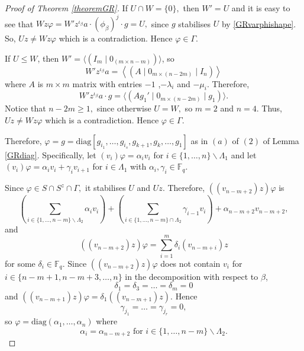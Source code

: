\documentclass[a4paper,reqno,11pt]{amsart}
\theoremstyle{definition}
\theoremstyle{remark}
\numberwithin{equation}{section}
\newcommand{\diag}{\mathrm{diag}}
\begin{document}
\begin{proof}[Proof of Theorem {\rm \ref{theoremGR}}]
 If $U \cap W=\{0\},$ then $W'=U$ and it is easy to see that $Wz \varphi = W'z^{\iota_{\beta}}a\cdot (\phi_{\beta})^j \cdot g= U,$ since $g$ stabilises $U$ by \eqref{GRvarphishape}. So, $Uz \ne Wz \varphi$ which is a contradiction. Hence $\varphi \in \Gamma.$

If $U \le W$, then $W'= \langle (I_m  \mid  0_{(m \times n-m)}) \rangle$, so 
$$W'z^{\iota_{\beta}}a= \left \langle 
(A \mid 0_{m \times (n-2m)} \mid I_n)
\right \rangle$$
where $A$ is $m \times m$ matrix with entries $-1$ ,$-\lambda_i$ and $- \mu_i$.
Therefore, $$W'z^{\iota_{\beta}}a \cdot g = \langle (A g_1'\mid 0_{m \times (n-2m)}\mid g_1) \rangle.$$ Notice that $n-2m\ge 1,$ since otherwise  $U = W,$ so $m=2$ and $n=4.$ Thus, $Uz \ne Wz \varphi$ which is a contradiction. Hence $\varphi \in \Gamma.$

Therefore, $\varphi = g= \diag[g_{i_1}, \ldots,g_{i_s}, g_{k+1}, g_k, \ldots,  g_1]$ as in $(a)$ of $(2)$ of Lemma
\ref{GRdiag}. Specifically, let $(v_i)\varphi =\alpha_i v_i$ for $i \in \{1, \ldots, n\} \backslash \Lambda_1$ and let $(v_i)\varphi = \alpha_i v_i + \gamma_i v_{i+1}$ for $i \in \Lambda_1$ with $\alpha_i, \gamma_i \in \mathbb{F}_q.$

 Since $\varphi \in S \cap S^z \cap \Gamma,$ it stabilises $U$ and $Uz.$  
Therefore, $((v_{n-m+2})z) \varphi$ is
\begin{equation*}
\label{vnm2zph}
\left(\underset{i \in \{1, \ldots, n-m\} \backslash \Lambda_2}{\sum} \alpha_i v_i \right) +
\left(\underset{i \in \{1, \ldots, n-m\} \cap \Lambda_2}{\sum} \gamma_{i-1} v_i \right) + \alpha_{n-m+2} v_{n-m+2},
\end{equation*}
and
$$((v_{n-m+2})z) \varphi= \sum_{i=1}^m \delta_i (v_{n-m+i})z$$
for some $\delta_i \in \mathbb{F}_q.$ Since $((v_{n-m+2})z) \varphi$ does not contain $v_i$ for $i \in \{n-m+1,n-m+3, \ldots, n\}$ in the decomposition with respect to $\beta$, 
$$\delta_1= \delta_3 = \ldots = \delta_m =0$$
and $((v_{n-m+1})z) \varphi= \delta_1 ((v_{n-m+1})z).$ Hence 
$$\gamma_{j_1} = \ldots = \gamma_{j_r}=0,$$
so $\varphi= \diag(\alpha_1, \ldots, \alpha_n)$ where 
\begin{equation}
\label{GRalphasvnm2}
\alpha_i=\alpha_{n-m+2} \text{ for } i \in \{1, \ldots, n-m\} \backslash \Lambda_2.
\end{equation} 


\end{proof}
\end{document}
